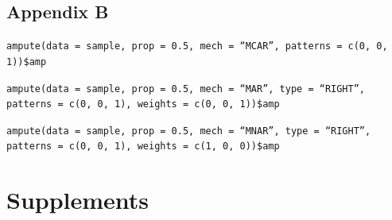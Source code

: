 \documentclass[11pt,a4paper]{article}
\newcommand{\code}[1]{\texttt{#1}}
\begin{document}
\subsection*{Appendix B}

\code{ampute(data = sample, prop = 0.5, mech = ``MCAR'', patterns = c(0, 0, 1))\$amp}

\vspace{5mm}
\noindent \code{ampute(data = sample, prop = 0.5, mech = ``MAR'', type = ``RIGHT'', patterns = c(0, 0, 1), weights = c(0, 0, 1))\$amp}

\vspace{5mm}
\noindent \code{ampute(data = sample, prop = 0.5, mech = ``MNAR'', type = ``RIGHT'', patterns = c(0, 0, 1), weights = c(1, 0, 0))\$amp}

\section*{Supplements}
\end{document}

